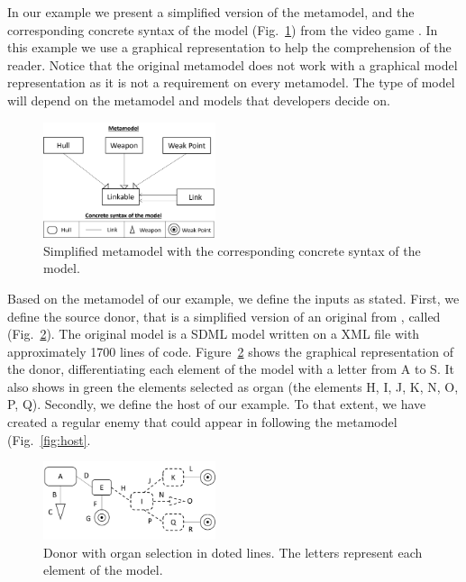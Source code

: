 In our example we present a simplified version of the metamodel, and the corresponding concrete syntax of the model (Fig.~\ref{fig:metamodel+syntax}) from the video game \CaseStudy{}. In this example we use a graphical representation to help the comprehension of the reader. Notice that the original metamodel does not work with a graphical model representation as it is not a requirement on every metamodel. The type of model will depend on the metamodel and models that developers decide on.

\begin{figure}[h]
    \centering
    \includegraphics[width=0.45\textwidth]{Figures/metamodel+syntax.png}
    \caption{Simplified metamodel with the corresponding concrete syntax of the model.}
    \label{fig:metamodel+syntax}
\end{figure}

Based on the metamodel of our example, we define the inputs as stated. 
First, we define the source donor, that is a simplified version of an original  from \CaseStudy{}, called  (Fig.~\ref{fig:donor}). The original model is a SDML model written on a XML file with approximately 1700 lines of code. Figure~\ref{fig:donor} shows the graphical representation of the donor, differentiating each element of the model with a letter from A to S. It also shows in green the elements selected as organ (the elements H, I, J, K, N, O, P, Q).
Secondly, we define the host of our example. To that extent, we have created a regular enemy that could appear in \CaseStudy{} following the metamodel (Fig.~\ref{fig:host}.

\begin{figure}[h]
    \centering
    \includegraphics[width=0.45\textwidth]{Figures/donor+organ.png}
    \caption{Donor with organ selection in doted lines. The letters represent each element of the model.}
    \label{fig:donor}
\end{figure}

